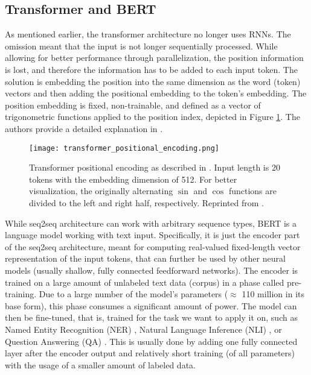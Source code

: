 \subsection{Transformer and BERT}

As mentioned earlier, the transformer architecture no longer uses RNNs.
The omission meant that the input is not longer sequentially processed.
While allowing for better performance through parallelization, the position information is lost, and therefore the information has to be added to each input token.
The solution is embedding the position into the same dimension as the word (token) vectors and then adding the positional embedding to the token's embedding.
The position embedding is fixed, non-trainable, and defined as a vector of trigonometric functions applied to the position index, depicted in Figure \ref{fig:pos_emb}.
The authors provide a detailed explanation in \citep[Section 3.5]{attention-is-all-you-need}.

\begin{figure}[!htb]
        \centering
        \texttt{[image: transformer\_positional\_encoding.png]}
        \caption[Positional Encoding of Transformer's Input]{Transformer positional encoding as described in \citep{attention-is-all-you-need}. Input length is 20 tokens with the embedding dimension of 512. For better visualization, the originally alternating $\sin$ and $\cos$ functions are divided to the left and right half, respectively. Reprinted from \citep{illustrated-transformer}.}
        \label{fig:pos_emb}
\end{figure}

While seq2seq architecture can work with arbitrary sequence types, BERT is a language model working with text input. 
Specifically, it is just the encoder part of the seq2seq architecture, meant for computing real-valued fixed-length vector representation of the input tokens, that can further be used by other neural models (usually shallow, fully connected feedforward networks).
The encoder is trained on a large amount of unlabeled text data (corpus) in a phase called pre-training.
Due to a large number of the model's parameters ($\approx$ 110 million in its base form), this phase consumes a significant amount of power. 
The model can then be fine-tuned, that is, trained for the task we want to apply it on, such as Named Entity Recognition (NER) \citep{ner}, Natural Language Inference (NLI) \citep{nli-bowman,nli-williams}, or Question Answering (QA) \citep{squad}. 
This is usually done by adding one fully connected layer after the encoder output and relatively short training (of all parameters) with the usage of a smaller amount of labeled data. 


